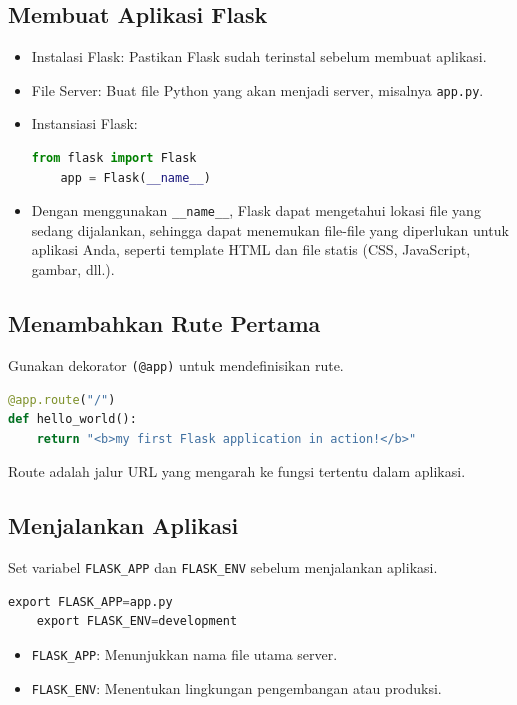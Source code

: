 \documentclass{article}
\begin{document}
\subsection{Membuat Aplikasi Flask}
\begin{itemize}
    \item Instalasi Flask: Pastikan Flask sudah terinstal sebelum membuat aplikasi.
    \item File Server: Buat file Python yang akan menjadi server, misalnya \verb|app.py|.
    \item Instansiasi Flask:
          \begin{lstlisting}[language=Python, caption={}, captionpos=b]
    from flask import Flask
    app = Flask(__name__)
\end{lstlisting}
    \item Dengan menggunakan \verb|__name__|, Flask dapat mengetahui lokasi file yang sedang dijalankan, sehingga dapat menemukan file-file yang diperlukan untuk aplikasi Anda, seperti template HTML dan file statis (CSS, JavaScript, gambar, dll.).
\end{itemize}

\subsection{Menambahkan Rute Pertama}
Gunakan dekorator \verb|(@app)| untuk mendefinisikan rute.
\begin{lstlisting}[language=Python, caption={}, captionpos=b]
@app.route("/")
def hello_world():
    return "<b>my first Flask application in action!</b>"
\end{lstlisting}
Route adalah jalur URL yang mengarah ke fungsi tertentu dalam aplikasi.

\subsection{Menjalankan Aplikasi}
Set variabel \verb|FLASK_APP| dan \verb|FLASK_ENV| sebelum menjalankan aplikasi.
\begin{lstlisting}[language=Python, caption={}, captionpos=b]
    export FLASK_APP=app.py
    export FLASK_ENV=development
\end{lstlisting}
\begin{itemize}
    \item \verb|FLASK_APP|: Menunjukkan nama file utama server.
    \item \verb|FLASK_ENV|: Menentukan lingkungan pengembangan atau produksi.
\end{itemize}
\end{document}
